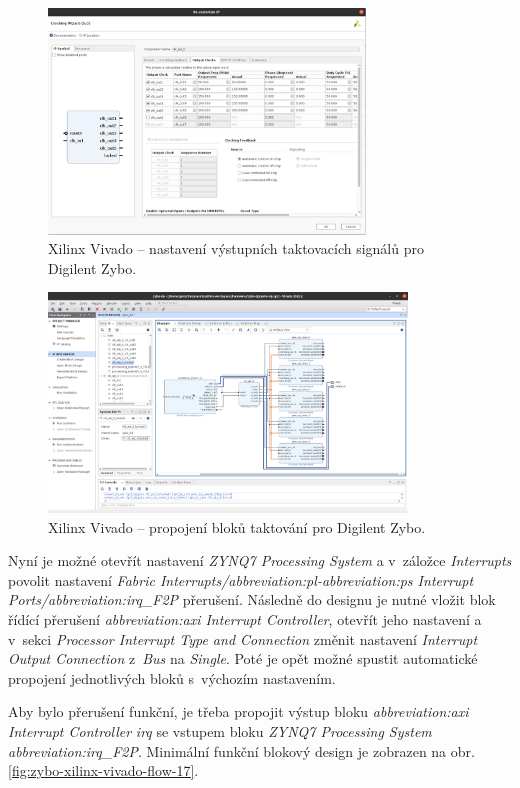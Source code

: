 \documentclass[a4paper, twoside, 11pt]{article}
\newcommand{\fbar}{\FloatBarrier}
\begin{document}
\begin{appendices}
		\begin{figure}[htbp!]
			\centering
			\includegraphics[width=0.75\textwidth]{src/png/zybo-xilinx-vivado-flow/zybo-xilinx-vivado-flow-36.jpg}
			\caption{Xilinx Vivado – nastavení výstupních taktovacích signálů pro Digilent Zybo.}
			\label{fig:zybo-xilinx-vivado-flow-36}
		\end{figure}

		\begin{figure}[htbp!]
			\centering
			\includegraphics[width=0.85\textwidth]{src/png/zybo-xilinx-vivado-flow/zybo-xilinx-vivado-flow-12.jpg}
			\caption{Xilinx Vivado – propojení bloků taktování pro Digilent Zybo.}
			\label{fig:zybo-xilinx-vivado-flow-12}
		\end{figure}

		\fbar

		Nyní je možné otevřít nastavení \textit{ZYNQ7 Processing System} a v~záložce \textit{Interrupts} povolit nastavení \textit{Fabric Interrupts/\gls{abbreviation:pl}-\gls{abbreviation:ps} Interrupt Ports/\gls{abbreviation:irq}\_F2P} přerušení. Následně do designu je nutné vložit blok řídící přerušení \textit{\gls{abbreviation:axi} Interrupt Controller}, otevřít jeho nastavení a v~sekci \textit{Processor Interrupt Type and Connection} změnit nastavení \textit{Interrupt Output Connection} z~\textit{Bus} na \textit{Single}. Poté je opět možné spustit automatické propojení jednotlivých bloků s~výchozím nastavením.\par
		Aby bylo přerušení funkční, je třeba propojit výstup bloku \textit{\gls{abbreviation:axi} Interrupt Controller} \textit{irq} se vstupem bloku \textit{ZYNQ7 Processing System} \textit{\gls{abbreviation:irq}\_F2P}. Minimální funkční blokový design je zobrazen na obr. \ref{fig:zybo-xilinx-vivado-flow-17}.


\end{appendices}
\end{document}
